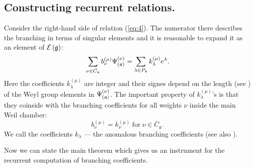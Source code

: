\documentclass[12pt]{iopart}
\theoremstyle{definition}
\newcommand{\af}{\mathfrak{a}}
\begin{document}
\subsection{Constructing recurrent relations.}
\label{subsec:Construct-recurrent-rel}

Consider the right-hand side of relation (\ref{eq:4}).
The numerator there describes the branching in terms of singular elements and
it is reasonable to expand it as an element of $\mathcal{E}\left( \frak{g} \right)$:
\begin{equation}
  \label{eq:21}
  \sum_{\nu \in \bar{C_{\mathfrak{a}}}}b_{\nu }^{\left( \mu \right) }\Psi _{\left( \frak{%
        a}\right) }^{\left( \nu \right) }=\sum_{\lambda \in P_{\af}}k_{\lambda
  }^{\left( \mu \right) }e^{\lambda }.
\end{equation}
Here the coefficients $k_{\lambda}^{\left( \mu \right) }$ are integer and their signes
depend on the length (see \cite{humphreys1997introduction})  of the Weyl group elements in
$\Psi _{\left( \frak{a}\right) }^{\left( \nu \right) }$. The important property of
$k_{\lambda}^{\left( \mu \right) }$'s is that they coinside with the branching coefficients
for all weights $\nu$ inside the main Weil chamber:
\begin{equation}
  b^{(\mu)}_{\nu}=k^{(\mu)}_{\nu} \; \mbox{for} \; \nu\in \bar{C}_{\mathfrak{a}}.
\label{eq:21-1}
\end{equation}
We call the coefficients $k_{\lambda}$ --- the anomalous branching coefficients
(see also \cite{ilyin812pbc}).

Now we can state the main theorem which gives us an instrument for the
recurrent computation of branching coefficients.
\end{document}
